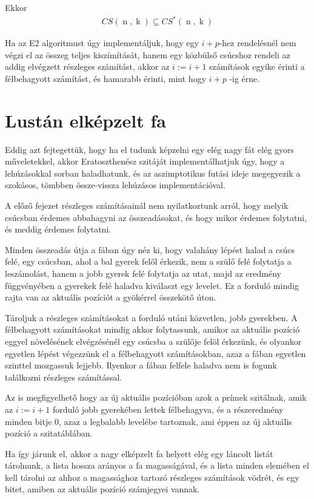 \documentclass[a4paper]{article}
\newcommand*{\vK}{\ensuremath{\operatorname{k}}}
\newcommand*{\vN}{\ensuremath{\operatorname{n}}}
\begin{document}
Ekkor
\begin{align*}
CS(\vN, \vK) \subseteq CS^{*}(\vN, \vK)
\end{align*}

Ha az E2 algoritmust úgy implementáljuk, hogy egy $i+p$-hez
rendelésnél nem végzi el az összeg teljes kiszímítását,
hanem egy közbülső csúcshoz rendeli az addig elvégzett részleges számítást,
akkor az $i:=i+1$ számítások egyike érinti a félbehagyott számítást,
és hamarabb érinti, mint hogy $i+p$ -ig érne.

\section{Lustán elképzelt fa}

Eddig azt fejtegettük, hogy ha el tudunk képzelni egy elég nagy fát elég gyors műveletekkel,
akkor Eratoszthenész szitáját implementálhatjuk úgy, hogy a lehúzásokkal sorban haladhatunk,
és az aszimptotikus futási ideje megegyezik a szokásos, tömbben össze-vissza
lehúzásos implementációval.

A előző fejezet részleges számításainál nem nyilatkoztunk arról, hogy melyik csúcsban érdemes abbahagyni az összeadásokat, és hogy mikor érdemes folytatni, és meddig érdemes folytatni.

Minden összeadás útja a fában úgy néz ki, hogy valahány lépést halad a csúcs felé,
egy csúcsban, ahol a bal gyerek felől érkezik, nem a szülő felé folytatja a leszámolást,
hanem a jobb gyerek felé folytatja az utat, majd az eredmény függvényében a gyerekek felé
haladva kiválaszt egy levelet. Ez a forduló mindig rajta van az aktuális pozíciót
a gyökérrel összekötő úton.

Tároljuk a részleges számításokat a forduló utáni közvetlen, jobb gyerekben.
A félbehagyott számításokat mindig akkor folytassunk, amikor az aktuális pozíció eggyel növelésének elvégzésénél egy csúcsba a szülője felöl érkezünk, és olyankor egyetlen lépést végezzünk el a félbehagyott számításokban, azaz a fában egyetlen szinttel mozgassuk lejjebb.
Ilyenkor a fában felfele haladva nem is fogunk találkozni részleges számítással.

Az is megfigyelhető hogy az új aktuális pozícióban azok a prímek szitálnak,
amik az $i:=i+1$ forduló jobb gyerekében lettek félbehagyva, és a részeredmény minden bitje 0,
azaz a legbalabb levelébe tartoznak, ami éppen az új aktuális pozíció
a szitatáblában.

Ha így járunk el, akkor a nagy elképzelt fa helyett elég egy láncolt listát tárolnunk,
a lista hossza arányos a fa magasságával, és a lista minden elemében el kell tárolni az ahhoz a magassághoz tartozó részleges számítások vödrét, és egy bitet,
amiben az aktuális pozíció számjegyei vannak.
\end{document}
